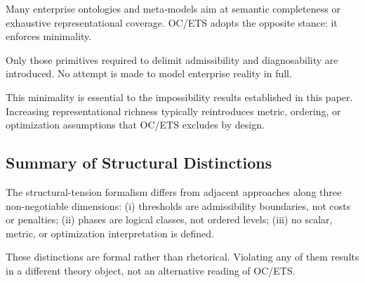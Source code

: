 Many enterprise ontologies and meta-models aim at semantic completeness or
exhaustive representational coverage. OC/ETS adopts the opposite stance:
it enforces minimality.

Only those primitives required to delimit admissibility and
diagnosability are introduced. No attempt is made to model enterprise
reality in full.

This minimality is essential to the impossibility results established in
this paper. Increasing representational richness typically reintroduces
metric, ordering, or optimization assumptions that OC/ETS excludes by
design.

\subsection{Summary of Structural Distinctions}

The structural-tension formalism differs from adjacent approaches along
three non-negotiable dimensions:
(i) thresholds are admissibility boundaries, not costs or penalties;
(ii) phases are logical classes, not ordered levels;
(iii) no scalar, metric, or optimization interpretation is defined.

These distinctions are formal rather than rhetorical. Violating any of
them results in a different theory object, not an alternative reading of
OC/ETS.

